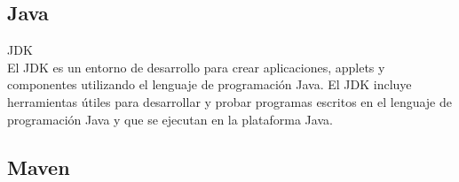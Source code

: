 \subsection{Java}
JDK \\
El JDK es un entorno de desarrollo para crear aplicaciones, applets y componentes utilizando el lenguaje de programación Java.
El JDK incluye herramientas útiles para desarrollar y probar programas escritos en el lenguaje de programación Java y que se ejecutan en la plataforma Java.
\subsection{Maven}
